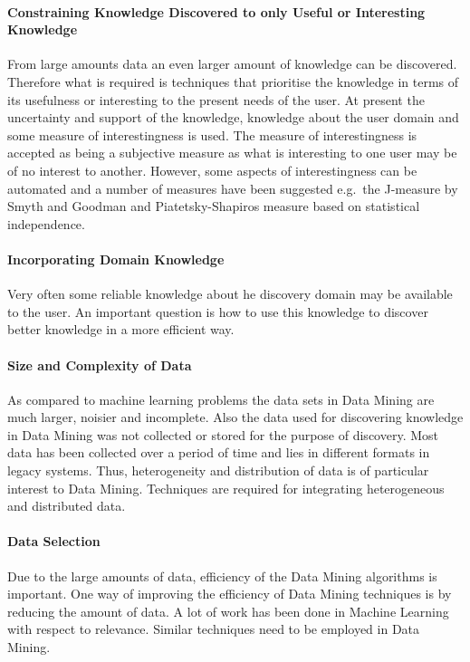 \documentclass[a4paper,12pt,notitlepage,pdftex]{scrreprt}
\begin{document}
    \paragraph{Constraining Knowledge Discovered to only Useful or Interesting Knowledge}
        From large amounts data an even larger amount of knowledge can be discovered.
        Therefore what is required is techniques that prioritise the knowledge in terms of its usefulness or
        interesting to the present needs of the user.
        At present the uncertainty and support of the knowledge, knowledge about the user domain and some measure of
        interestingness is used.
        The measure of interestingness is accepted as being a subjective measure as what is interesting to one user
        may be of no interest to another.
        However, some aspects of interestingness can be automated and a number of measures have been suggested e.g.\
        the J-measure by Smyth and Goodman and Piatetsky-Shapiros measure based on statistical independence.
    \paragraph{Incorporating Domain Knowledge}
        Very often some reliable knowledge about he discovery domain may be available to the user.
        An important question is how to use this knowledge to discover better knowledge in a more efficient way.
    \paragraph{Size and Complexity of Data}
        As compared to machine learning problems the data sets in Data Mining are much larger, noisier and incomplete.
        Also the data used for discovering knowledge in Data Mining was not collected or stored for the purpose of
        discovery.
        Most data has been collected over a period of time and lies in different formats in legacy systems.
        Thus, heterogeneity and distribution of data is of particular interest to Data Mining.
        Techniques are required for integrating heterogeneous and distributed data.
    \paragraph{Data Selection}
        Due to the large amounts of data, efficiency of the Data Mining algorithms is important.
        One way of improving the efficiency of Data Mining techniques is by reducing the amount of data.
        A lot of work has been done in Machine Learning with respect to relevance.
        Similar techniques need to be employed in Data Mining.
\end{document}
